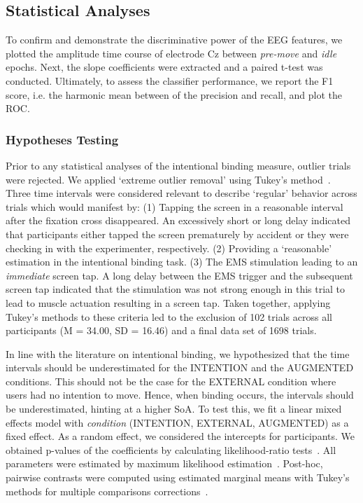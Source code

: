 \subsection{Statistical Analyses}
To confirm and demonstrate the discriminative power of the EEG features, we plotted the amplitude time course of electrode Cz between \textit{pre-move} and \textit{idle} epochs. Next, the slope coefficients were extracted and a paired t-test was conducted. Ultimately, to assess the classifier performance, we report the F1 score, i.e. the harmonic mean between of the precision and recall, and plot the ROC.

\subsubsection{Hypotheses Testing}
Prior to any statistical analyses of the intentional binding measure, outlier trials were rejected. We applied `extreme outlier removal' using Tukey's method~\cite{Tukey1949-sl}. Three time intervals were considered relevant to describe `regular' behavior across trials which would manifest by: (1) Tapping the screen in a reasonable interval after the fixation cross disappeared. An excessively short or long delay indicated that participants either tapped the screen prematurely by accident or they were checking in with the experimenter, respectively. (2) Providing a `reasonable' estimation in the intentional binding task. (3) The EMS stimulation leading to an \textit{immediate} screen tap. A long delay between the EMS trigger and the subsequent screen tap indicated that the stimulation was not strong enough in this trial to lead to muscle actuation resulting in a screen tap. Taken together, applying Tukey's methods to these criteria led to the exclusion of 102 trials across all participants (M = 34.00, SD = 16.46) and a final data set of 1698 trials.

In line with the literature on intentional binding, we hypothesized that the time intervals should be underestimated for the INTENTION and the AUGMENTED conditions. This should not be the case for the EXTERNAL condition where users had no intention to move. Hence, when binding occurs, the intervals should be underestimated, hinting at a higher SoA. To test this, we fit a linear mixed effects model with \textit{condition} (INTENTION, EXTERNAL, AUGMENTED) as a fixed effect. As a random effect, we considered the intercepts for participants. We obtained p-values of the coefficients by calculating likelihood-ratio tests~\cite{winterLinearModelsLinear2013}. All parameters were estimated by maximum likelihood estimation~\cite[see][]{Pinheiro2000}. Post-hoc, pairwise contrasts were computed using estimated marginal means with Tukey's methods for multiple comparisons corrections~\cite{Lenth2020-xk}.

